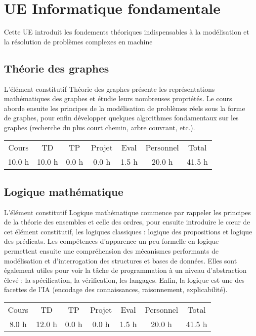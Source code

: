 \section{UE Informatique fondamentale}%
\label{sec:UEInformatiquefondamentale}%
Cette UE introduit les fondements théoriques indispensables à la modélisation et la résolution de problèmes complexes en machine%
\subsection{Théorie des graphes}%
\label{subsec:Thoriedesgraphes}%

%
L'élément constitutif Théorie des graphes présente les représentations mathématiques des graphes et étudie leurs nombreuses propriétés. Le cours aborde ensuite les principes de la modélisation de problèmes réels sous la forme de graphes, pour enfin développer quelques algorithmes fondamentaux sur les graphes (recherche du plus court chemin, arbre couvrant, etc.).%
\begin{longtable}{c c c c c c c}%
\hline%
Cours&TD&TP&Projet&Eval&Personnel&Total\\%
10.0 h&10.0 h&0.0 h&0.0 h&1.5 h&20.0 h&41.5 h\\%
\hline%
\end{longtable}%
\subsection{Logique mathématique}%
\label{subsec:Logiquemathmatique}%

%
L'élément constitutif Logique mathématique commence par rappeler les principes de la théorie des ensembles et celle des ordres, pour ensuite introduire le cœur de cet élément constitutif, les logiques classiques : logique des propositions et logique des prédicats. Les compétences d'apparence un peu formelle en logique permettent ensuite une compréhension des mécanismes performants de modélisation et d'interrogation des structures et bases de données. Elles sont également utiles pour voir la tâche de programmation à un niveau d'abstraction élevé : la spécification, la vérification, les langages. Enfin, la logique est une des facettes de l'IA (encodage des connaissances, raisonnement, explicabilité). %
\begin{longtable}{c c c c c c c}%
\hline%
Cours&TD&TP&Projet&Eval&Personnel&Total\\%
8.0 h&12.0 h&0.0 h&0.0 h&1.5 h&20.0 h&41.5 h\\%
\hline%
\end{longtable}%
